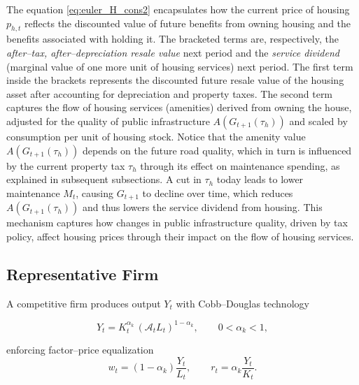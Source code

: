 \begin{enumerate}
  \vskip 0.3cm
  The equation \ref{eq:euler_H_cons2} encapsulates how the current price of housing $p_{h,t}$ reflects the discounted value of future benefits from owning housing and the benefits associated with holding it. 
  The bracketed terms are, respectively, the \emph{after–tax, after–depreciation resale value} next period and the \emph{service dividend} (marginal value of one more unit of housing services) next period.  The first term inside the brackets represents the discounted future resale value of the housing asset after accounting for depreciation and property taxes. The second term captures the flow of housing services (amenities) derived from owning the house, adjusted for the quality of public infrastructure $A(G_{t+1}(\tau_h))$ and scaled by consumption per unit of housing stock. Notice that the amenity value $A(G_{t+1}(\tau_h))$ depends on the future road quality, which in turn is influenced by the current property tax $\tau_h$ through its effect on maintenance spending, as explained in subsequent subsections. A cut in $\tau_h$ today leads to lower maintenance $M_t$, causing $G_{t+1}$ to decline over time, which reduces $A(G_{t+1}(\tau_h))$ and thus lowers the service dividend from housing. This mechanism captures how changes in public infrastructure quality, driven by tax policy, affect housing prices through their impact on the flow of housing services.
  
\end{enumerate}


 
\subsection{Representative Firm}
A competitive firm produces output $Y_t$ with Cobb--Douglas technology

\begin{equation}
Y_t = K_t^{\alpha_k}\,(\mathcal{A}_tL_t)^{1-\alpha_k},\qquad 0<\alpha_k<1,
\end{equation}


enforcing factor–price equalization
\begin{equation}
  w_t = (1-\alpha_k)\frac{Y_t}{L_t},\qquad r_t = \alpha_k\frac{Y_t}{K_t}.
\end{equation}

